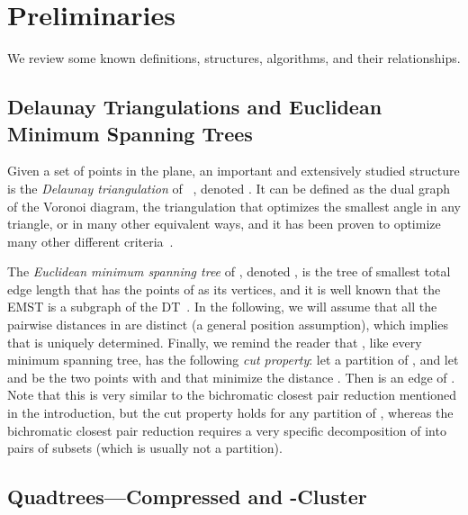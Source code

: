 \documentclass[11pt]{paper}
\begin{document}
\section {Preliminaries} \label {sec:prelim}

  We review some known definitions, structures, 
  algorithms, and their relationships.


  \subsection {Delaunay Triangulations and Euclidean Minimum Spanning Trees}

    Given a set  of  points in the plane, an important and extensively
    studied structure is the \emph {Delaunay triangulation} of ~\cite
    {deBergChvKrOv08,BoissonnatYv98,d-slsv-34,PreparataSh85,ShamosHo75}, 
    denoted .  It can be defined as the dual graph of the
    Voronoi diagram, the triangulation that optimizes the smallest angle in any
    triangle, or in many other equivalent ways, and it has been proven to
    optimize many other different criteria~\cite {m-pdt-97}.

    The \emph {Euclidean minimum spanning tree} of , denoted , 
    is the tree of smallest total edge length that has the
    points of  as its vertices, and it is well known that the EMST is a
    subgraph of the DT~\cite[Theorem~7]{ShamosHo75}.
    In the following, we will assume that all the pairwise distances in
     are distinct (a general position assumption), which implies that
     is uniquely determined. Finally, we remind the reader that
    , like every minimum spanning tree, has 
    the following \emph{cut property}: let 
    a partition of , and let  and  be the two points with  and
     that minimize  the distance . Then  is an edge
    of . Note that this is very similar to the bichromatic closest 
    pair reduction mentioned in the introduction, but the cut property
    holds for any partition of , whereas the bichromatic closest
    pair reduction requires a very specific decomposition of  into pairs
    of subsets (which is usually not a partition).

 \subsection {Quadtrees---Compressed and -Cluster}
  \label {sec:cqt&cqt}
\end{document}
